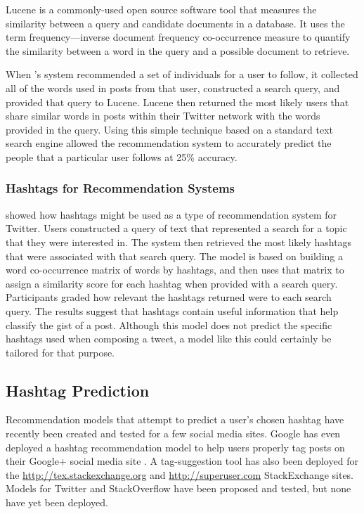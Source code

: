 \documentclass[man,floatsintext,donotrepeattitle]{apa6}
\begin{document}
Lucene \parencite{McCandless2010} is a commonly-used open source software tool that measures the similarity between a query and candidate documents in a database.
It uses the term frequency---inverse document frequency co-occurrence measure to quantify the similarity between a word in the query and a possible document to retrieve.

When \citeauthor{Hannon2010}'s system recommended a set of individuals for a user to follow, it collected all of the words used in posts from that user, constructed a search query, and provided that query to Lucene.
Lucene then returned the most likely users that share similar words in posts within their Twitter network with the words provided in the query.
Using this simple technique based on a standard text search engine allowed the recommendation system to accurately predict the people that a particular user follows at 25\% accuracy.

\subsubsection{Hashtags for Recommendation Systems}

\textcite{Efron2010} showed how hashtags might be used as a type of recommendation system for Twitter.
Users constructed a query of text that represented a search for a topic that they were interested in.
The system then retrieved the most likely hashtags that were associated with that search query.
The model is based on building a word co-occurrence matrix of words by hashtags, and then uses that matrix to assign a similarity score for each hashtag when provided with a search query.
Participants graded how relevant the hashtags returned were to each search query.
The results suggest that hashtags contain useful information that help classify the gist of a post. 
Although this model does not predict the specific hashtags used when composing a tweet, a model like this could certainly be tailored for that purpose.

\subsection{Hashtag Prediction}

Recommendation models that attempt to predict a user's chosen hashtag have recently been created and tested for a few social media sites.
Google has even deployed a hashtag recommendation model to help users properly tag posts on their Google+ social media site \parencite{GoogleKeynote2013}.
A tag-suggestion tool has also been deployed for the \url{http://tex.stackexchange.org} and \url{http://superuser.com} StackExchange sites.
Models for Twitter and StackOverflow have been proposed and tested, but none have yet been deployed.
\end{document}
